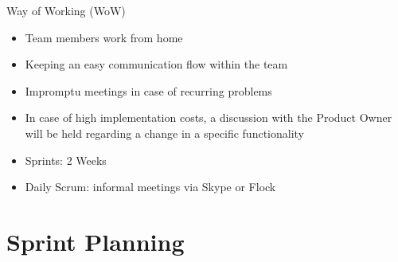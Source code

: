 \documentclass{beamer}
\begin{document}

\begin{frame}{Way of Working (WoW)}
	
	\begin{itemize}
		 
		\item Team members work from home
		\item Keeping an easy communication flow within the team
		\item Impromptu meetings in case of recurring problems
		\item In case of high implementation costs, a discussion with the Product Owner will be held regarding a change in a specific functionality	
		\item Sprints: 2 Weeks
		\item Daily Scrum: informal meetings via Skype or Flock
		
		
		
	\end{itemize}

\end{frame}


\section{Sprint Planning}


\end{document}
